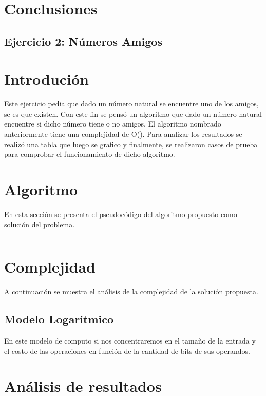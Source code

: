 \documentclass[a4paper, 12pt] {article}
\begin{document}
\section*{Conclusiones}

\newpage

\begin{center}
\section*{Ejercicio 2: N\'umeros Amigos}
\end{center}

\bigskip
\section*{Introduci\'on}
Este ejercicio pedia que dado un n\'umero natural se encuentre uno de los amigos, se es que existen.
Con este fin se pens\'o un algoritmo que dado un n\'umero natural encuentre si dicho n\'umero tiene o no amigos.
El algoritmo nombrado anteriormente tiene una complejidad de O(). Para analizar los resultados se realiz\'o una tabla que luego se grafico y finalmente, se realizaron casos de prueba para comprobar el funcionamiento de dicho algoritmo. 
\section*{Algoritmo}
En esta secci\'on se presenta el pseudoc\'odigo del algoritmo propuesto como soluci\'on del problema.
\begin{verbatim}
\end{verbatim}

\section*{Complejidad}
A continuaci\'on se muestra el an\'alisis de la complejidad de la soluci\'on propuesta.
\subsection*{Modelo Logaritmico}
En este modelo de computo si nos concentraremos en el tama\~{n}o de la entrada y el costo de las operaciones en funci\'on de la cantidad de bits de sus operandos.

\section*{An\'alisis de resultados}
\end{document}
